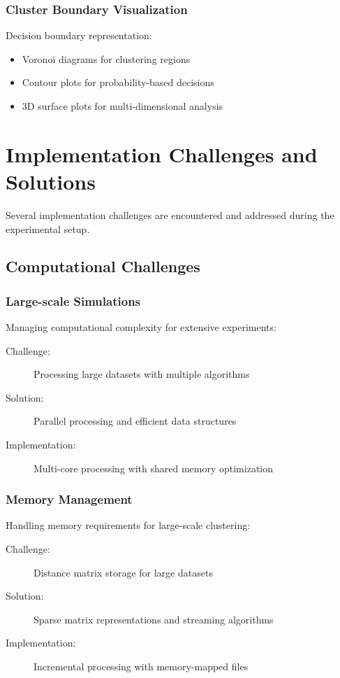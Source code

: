 \subsubsection{Cluster Boundary Visualization}
Decision boundary representation:
\begin{itemize}
\item Voronoi diagrams for clustering regions
\item Contour plots for probability-based decisions
\item 3D surface plots for multi-dimensional analysis
\end{itemize}

\section{Implementation Challenges and Solutions}
Several implementation challenges are encountered and addressed during the experimental setup.

\subsection{Computational Challenges}

\subsubsection{Large-scale Simulations}
Managing computational complexity for extensive experiments:
\begin{description}
\item[Challenge:] Processing large datasets with multiple algorithms
\item[Solution:] Parallel processing and efficient data structures
\item[Implementation:] Multi-core processing with shared memory optimization
\end{description}

\subsubsection{Memory Management}
Handling memory requirements for large-scale clustering:
\begin{description}
\item[Challenge:] Distance matrix storage for large datasets
\item[Solution:] Sparse matrix representations and streaming algorithms
\item[Implementation:] Incremental processing with memory-mapped files
\end{description}

